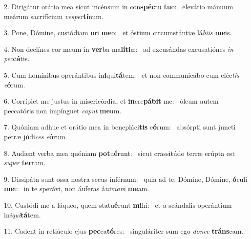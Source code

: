 2. Dirigátur orátio mea sicut incénsum in con\textbf{spéc}tu \textbf{tu}o: \ast\  elevátio mánuum meárum sacrifícium \textit{ves}\textit{per}\textbf{tí}num.\

3. Pone, Dómine, custódiam \textbf{o}ri \textbf{me}o: \ast\  et óstium circumstántiæ lá\textit{bi}\textit{is} \textbf{me}is.\

4. Non declínes cor meum in \textbf{ver}ba ma\textbf{lí}\textbf{ti}æ: \ast\  ad excusándas excusatiónes \textit{in} \textit{pec}\textbf{cá}tis.\

5. Cum homínibus operántibus in\textbf{i}qui\textbf{tá}tem: \ast\  et non communicábo cum eléc\textit{tis} \textit{e}\textbf{ó}rum.\

6. Corrípiet me justus in misericórdia, et \textbf{in}cre\textbf{pá}\textbf{bit} me: \ast\  óleum autem peccatóris non impínguet \textit{ca}\textit{put} \textbf{me}um.\

7. Quóniam adhuc et orátio mea in benepláci\textbf{tis} e\textbf{ó}rum: \ast\  absórpti sunt juncti petræ júdi\textit{ces} \textit{e}\textbf{ó}rum.\

8. Audient verba mea quóniam \textbf{pot}u\textbf{é}runt: \ast\  sicut crassitúdo terræ erúpta est \textit{su}\textit{per} \textbf{ter}ram.\

9. Dissipáta sunt ossa nostra secus inférnum: \dag\  quia ad te, Dómine, Dómine, \textbf{ó}culi \textbf{me}i: \ast\  in te sperávi, non áuferas á\textit{ni}\textit{mam} \textbf{me}am.\

10. Custódi me a láqueo, quem statu\textbf{é}runt \textbf{mi}hi: \ast\  et a scándalis operántium in\textit{i}\textit{qui}\textbf{tá}tem.\

11. Cadent in retiáculo ejus \textbf{pec}ca\textbf{tó}res: \ast\  singuláriter sum ego \textit{do}\textit{nec} \textbf{tráns}eam.\

